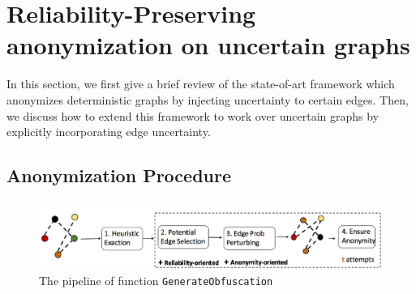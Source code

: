 \begin{sloppypar}
\section{Reliability-Preserving anonymization on uncertain graphs}
\end{sloppypar}
\label{sec:tech} 
In this section, we first give a brief review of the state-of-art framework which anonymizes deterministic graphs by injecting uncertainty to certain edges. Then, we discuss how to extend this framework to work over uncertain graphs by explicitly incorporating edge uncertainty.  

\subsection{Anonymization Procedure}
% 
\begin{figure}[!tb]
    \centering
    \includegraphics[scale=0.55]{figures/DegreeAUG/pipeline.eps}
    \caption{The pipeline of function \texttt{GenerateObfuscation}}
    \label{fig:genObfuscation}
\end{figure}

